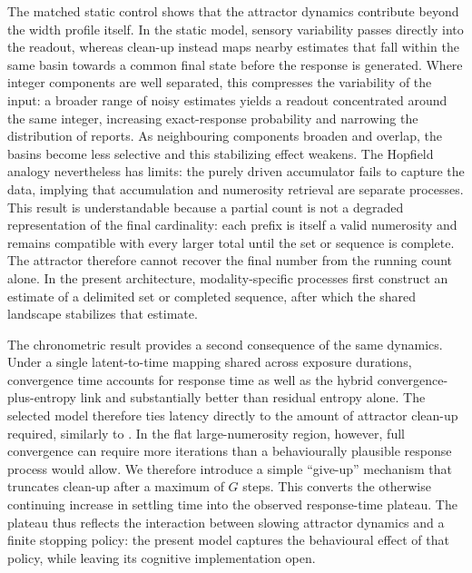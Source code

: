 \documentclass[Afour,sageh,times]{sagej}
\newif\ifmarkrevisions
\newcommand{\revised}[1]{\ifmarkrevisions{\color{red}#1}\else#1\fi}
\begin{document}
The matched static control shows that the attractor dynamics contribute beyond the width profile itself. In the static model, sensory variability passes directly into the readout, whereas clean-up instead maps nearby estimates that fall within the same basin towards a common final state before the response is generated. Where integer components are well separated, this compresses the variability of the input: a broader range of noisy estimates yields a readout concentrated around the same integer, increasing exact-response probability and narrowing the distribution of reports. As neighbouring components broaden and overlap, the basins become less selective and this stabilizing effect weakens. The Hopfield analogy nevertheless has limits: the purely driven accumulator fails to capture the data, implying that accumulation and numerosity retrieval are separate processes. This result is understandable because a partial count is not a degraded representation of the final cardinality: each prefix is itself a valid numerosity and remains compatible with every larger total until the set or sequence is complete. The attractor therefore cannot recover the final number from the running count alone. In the present architecture, modality-specific processes first construct an estimate of a delimited set or completed sequence, after which the shared landscape stabilizes that estimate.

The chronometric result provides a second consequence of the same dynamics. Under a single latent-to-time mapping shared across exposure durations, convergence time accounts for response time as well as the hybrid convergence-plus-entropy link and substantially better than residual entropy alone. The selected model therefore ties latency directly to the amount of attractor clean-up required\revised{, similarly to \citet{zorzi_computational_1999}.} In the flat large-numerosity region, however, full convergence can require more iterations than a behaviourally plausible response process would allow. We therefore introduce a simple ``give-up'' mechanism that truncates clean-up after a maximum of $G$ steps. This converts the otherwise continuing increase in settling time into the observed response-time plateau. The plateau thus reflects the interaction between slowing attractor dynamics and a finite stopping policy: the present model captures the behavioural effect of that policy, while leaving its cognitive implementation open.
\end{document}
